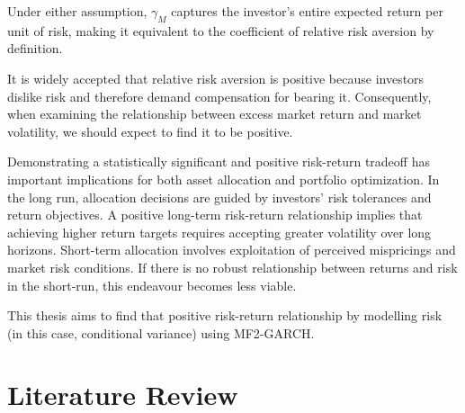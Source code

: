\documentclass[12pt]{article}
\begin{document}
Under either assumption, $\gamma_M$ captures the investor's entire expected return per unit of risk, making it equivalent to the coefficient of relative risk aversion by definition.\par
It is widely accepted that relative risk aversion is positive because investors dislike risk and therefore demand compensation for bearing it. Consequently, when examining the relationship between excess market return and market volatility, we should expect to find it to be positive.\par
Demonstrating a statistically significant and positive risk-return tradeoff has important implications for both asset allocation and portfolio optimization. In the long run, allocation decisions are guided by investors’ risk tolerances and return objectives. A positive long-term risk-return relationship implies that achieving higher return targets requires accepting greater volatility over long horizons. Short-term allocation involves exploitation of perceived mispricings and market risk conditions. If there is no robust relationship between returns and risk in the short-run, this endeavour becomes less viable.\par
This thesis aims to find that positive risk-return relationship by modelling risk (in this case, conditional variance) using MF2-GARCH.\par


\section{Literature Review}
\end{document}
